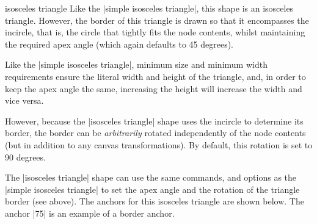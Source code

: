 \begin{shape}{isosceles triangle}
	Like the |simple isosceles triangle|, this shape is an isosceles triangle.
	However, the border of this triangle is drawn so that it encompasses
	the incircle, that is, the circle that tightly fits the node contents,
	whilst maintaining the required apex angle (which again defaults to
	45 degrees).
	
\begin{codeexample}[]
\end{codeexample}	

   Like the |simple isosceles triangle|, minimum size and minimum 
   width requirements ensure the literal width and height of the 
   triangle, and, in order to keep the apex angle the same, increasing
   the height will increase the width and vice versa.    
   
   However, because the |isosceles triangle| shape uses the incircle
   to determine its border, the border can be \emph{arbitrarily} rotated 
   independently of the node contents (but in addition to any canvas 
   transformations). By default, this rotation is set to 90 
   degrees.
	
\begin{codeexample}[]
\end{codeexample}	

	The |isosceles triangle| shape can use the same \pgfname{} commands,
	and \tikzname{} options as the |simple isosceles triangle| to set
	the apex angle and the rotation of the triangle border (see above).  
   The anchors for this isosceles triangle are shown below.
   The anchor |75| is an example of a border anchor.

\begin{codeexample}[]
\Huge
{}
\end{codeexample}

\end{shape}

